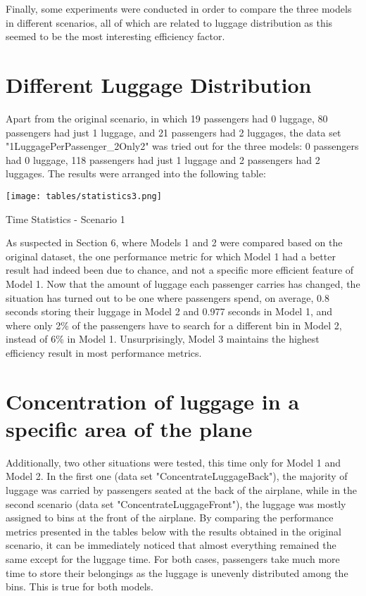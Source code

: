 Finally, some experiments were conducted in order to compare the three models in different scenarios, all of which are related to luggage distribution as this seemed to be the most interesting efficiency factor.

\section{Different Luggage Distribution}
Apart from the original scenario, in which 19 passengers had 0 luggage, 80 passengers had just 1 luggage, and 21 passengers had 2 luggages, the data set "1LuggagePerPassenger\_2Only2" was tried out for the three models: 0 passengers had 0 luggage, 118 passengers had just 1 luggage and 2 passengers had 2 luggages. The results were arranged into the following table:

\begin{table}[H]
  \texttt{[image: tables/statistics3.png]}
  \caption{Time Statistics - Scenario 1}
  \label{tbl:statistics3}
\end{table}

As suspected in Section 6, where Models 1 and 2 were compared based on the original dataset, the one performance metric for which Model 1 had a better result had indeed been due to chance, and not a specific more efficient feature of Model 1. Now that the amount of luggage each passenger carries has changed, the situation has turned out to be one where passengers spend, on average, 0.8 seconds storing their luggage in Model 2 and 0.977 seconds in Model 1, and where only 2\% of the passengers have to search for a different bin in Model 2, instead of 6\% in Model 1. Unsurprisingly, Model 3 maintains the highest efficiency result in most performance metrics.

\section{Concentration of luggage in a specific area of the plane}
Additionally, two other situations were tested, this time only for Model 1 and Model 2. In the first one (data set "ConcentrateLuggageBack"), the majority of luggage was carried by passengers seated at the back of the airplane, while in the second scenario (data set "ConcentrateLuggageFront"), the luggage was mostly assigned to bins at the front of the airplane. By comparing the performance metrics presented in the tables below with the results obtained in the original scenario, it can be immediately noticed that almost everything remained the same except for the luggage time. For both cases, passengers take much more time to store their belongings as the luggage is unevenly distributed among the bins. This is true for both models.

